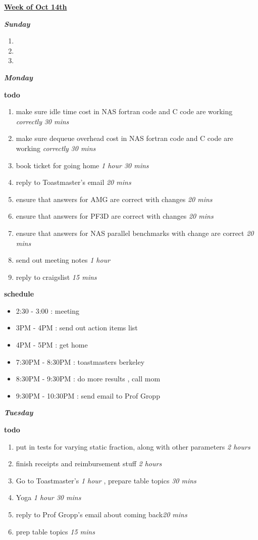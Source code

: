 \documentclass[11pt]{article}
\newcommand{\timeEst}[1]{\textit{#1}}
\begin{document}
\underline{\textbf{Week of Oct 14th}}

\textbf{\textit{Sunday}}
\begin{enumerate}
\item
\item
\item
\end{enumerate}

\textbf{\textit{Monday}}

\textbf{todo}
\begin{enumerate}

\item make sure idle time cost in NAS fortran code and C code are working \textit{correctly}  \timeEst{30 mins}
\item make sure dequeue overhead cost in NAS fortran code and C code are working \textit{correctly} \timeEst{30 mins}
\item book ticket for going home \timeEst{1 hour 30 mins}
\item reply to Toastmaster's email \timeEst{20 mins}

\item ensure that answers for AMG are correct with changes \timeEst{20 mins}
\item ensure that answers for PF3D are correct with changes \timeEst{20 mins}
\item ensure that answers for NAS parallel benchmarks with change are correct \timeEst{20 mins}
\item send out meeting notes \timeEst{1 hour}
\item reply to craigslist \timeEst{15 mins}
\end{enumerate}

\textbf{schedule }
\begin{itemize}
\item 2:30 - 3:00 : meeting
\item 3PM - 4PM :  send out action items list
\item 4PM - 5PM : get home
\item 7:30PM - 8:30PM : toastmasters berkeley
\item 8:30PM - 9:30PM :  do more results , call mom
\item 9:30PM - 10:30PM : send email to Prof Gropp
\end{itemize}

\textbf{\textit{Tuesday}}

\textbf{todo}
\begin{enumerate}
\item put in tests for varying static fraction, along with other parameters \timeEst{2 hours}
\item finish receipts and reimbursement stuff \timeEst{2 hours}
\item Go to Toastmaster's \timeEst{1 hour} , prepare table topics \timeEst{30 mins}
\item Yoga \timeEst{1 hour 30 mins}
\item reply to Prof Gropp's email about coming back\timeEst{20 mins}
\item prep table topics \timeEst{15 mins}
\end{enumerate}
\end{document}
